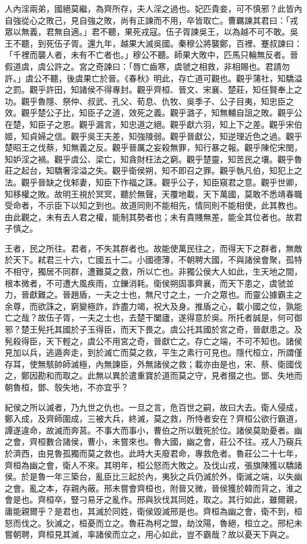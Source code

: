 人內淫兩弟，國絕莫繼，為齊所存，夫人淫之過也。妃匹貴妾，可不慎邪？此皆內自強從心之敗己，見自強之敗，尚有正諫而不用，卒皆取亡。曹羈諫其君曰：「戎眾以無義，君無自適。」君不聽，果死戎寇。伍子胥諫吳王，以為越不可不敢。吳王不聽，到死伍子胥。還九年，越果大滅吳國。秦穆公將襲鄭，百裡、蹇叔諫曰：「千裡而襲人者，未有不亡者也。」穆公不聽。師果大敗中，匹馬只輪無反者。晉假道虞，虞公許之。宮之奇諫曰：「唇亡齒寒，虞虢之相救，非相賜也。君請勿許。」虞公不聽，後虞果亡於晉。《春秋》明此，存亡道可觀也。觀乎蒲社，知驕溢之罰。觀乎許田，知諸侯不得專封。觀乎齊桓、晉文、宋襄、楚莊，知任賢奉上之功。觀乎魯隱、祭仲、叔武、孔父、荀息、仇牧、吳季子、公子目夷，知忠臣之效。觀乎楚公子比，知臣子之道，效死之義。觀乎潞子，知無輔自詛之敗。觀乎公在楚，知臣子之恩。觀乎漏言，知忠道之絕。觀乎獻六羽，知上下之差。觀乎宋伯姬，知貞婦之信。觀乎吳王夫差，知強陵弱。觀乎晉獻公，知逆理近色之過。觀乎楚昭王之伐蔡，知無義之反。觀乎晉厲之妄殺無罪，知行暴之報。觀乎陳佗宋閔，知妒淫之禍。觀乎虞公、梁亡，知貪財枉法之窮。觀乎楚靈，知苦民之壤。觀乎魯莊之起台，知驕奢淫溢之失。觀乎衛侯朔，知不即召之罪。觀乎執凡伯，知犯上之法。觀乎晉缺之伐邾妻，知臣下作福之誅。觀乎公子，知臣窺君之意。觀乎世卿，知移權之敗。故明王視於冥冥，聽於無聲，天覆地載，天下萬國，莫敢不悉靖春職受命者，不示臣下以知之到也。故道同則不能相先，情同則不能相使，此其教也。由此觀之，未有去人君之權，能制其勢者也；未有貴賤無差，能全其位者也。故君子慎之。


王者，民之所往。君者，不失其群者也。故能使萬民往之，而得天下之群者，無敵於天下。弒君三十六，亡國五十二。小國德薄，不朝聘大國，不與諸侯會聚，孤特不相守，獨居不同群，遭難莫之救，所以亡也。非獨公侯大人如此，生天地之間，根本微者，不可遭大風疾雨，立鑠消耗。衛侯朔固事齊襄，而天下患之，虞虢並力，晉獻難之。晉趙盾，一夫之士也，無尺寸之土，一介之眾也。而靈公據霸主之余尊，而欲誅之，窮變極詐，詐盡力竭，祝大及身。推盾之心，載小國之位，孰能亡之哉？故伍子胥，一夫之士也，去楚干闔廬，遂得意於吳。所托者誠是，何可御邪？楚王髡托其國於子玉得臣，而天下畏之。虞公托其國於宮之奇，晉獻患之。及髡殺得臣，天下輕之，虞公不用宮之奇，晉獻亡之。存亡之端，不可不知也。諸侯見加以兵，逃遁奔走，到於滅亡而莫之救，平生之素行可見也。隱代桓立，所謂僅存耳，使無駭帥師滅極，內無諫臣，外無諸侯之救；載亦由是也，宋、蔡、衛國伐之，鄭因勘和而取之。此無以異於遣重寶於道而莫之守，見者掇之也。鄧、失地而朝魯桓，鄧、彀失地，不亦宜乎？


紀侯之所以滅者，乃九世之仇也。一旦之言，危百世之嗣，故曰大去。衛人侵成，鄭入成，及齊師圍成，三被大兵，終滅，莫之救，所恃者安在？齊桓公欲行霸道，譚遂違命，故滅而奔莒。不事大而事小，曹伯之所以戰死於位。諸侯莫助憂者。幽之會，齊桓數合諸侯，曹小，未嘗來也。魯大國，幽之會，莊公不往。戎人乃窺兵於濟西，由見魯孤獨而莫之救也。此時大夫廢君命，專救危者。魯莊公二十七年，齊桓為幽之會，衛人不來。其明年，桓公怒而大敗之。及伐山戎，張旗陳獲以驕諸侯。於是魯一年三築台，亂臣比三起於內，夷狄之兵仍滅於外，衛滅之端，以失幽之會。亂之本，存親內蔽。邢未嘗會齊桓也，附晉又微，晉侯獲於韓而背之，淮之會是也。齊桓卒，豎刁易牙之亂作。邢與狄伐其同姓，取之。其行如此，雖爾親，庸能親爾乎？是君也，其滅於同姓，衛侯毀滅邢是也。齊桓為幽之會，衛不到，桓怒而伐之。狄滅之，桓憂而立之。魯莊為柯之盟，劫汶陽，魯絕，桓立之。邢杞未嘗朝聘，齊桓見其滅，率諸侯而立之，用心如此，豈不霸哉？故以憂天下與之。

